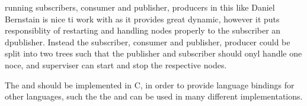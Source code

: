 running subscribers, consumer and publisher, producers in this like Daniel Bernstain is nice ti work with as it provides great dynamic, however it puts responsiblity of restarting and handling nodes properly to the subscriber an dpublisher.  Instead the subscriber, consumer and publisher, producer could be split into two trees such that the publisher and subscriber should onyl handle one noce, and superviser can start and stop the respective nodes.


The \pub{} and \sub{} should be implemented in C, in order to provide language bindings for other languages, such the the \pub{} and \sub{} can be used in many different implementations.


